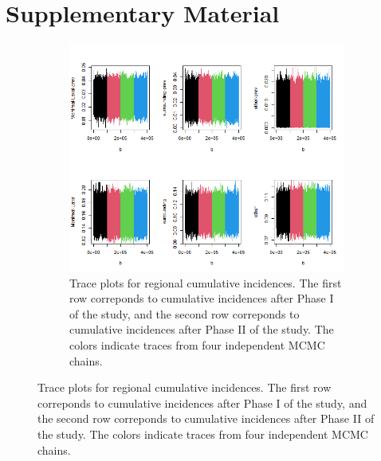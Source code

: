 \section{Supplementary Material}
\captionsetup[subfigure]{labelformat=empty}
\begin{figure}[ht!]
\centering
\begin{subfigure}[b]{\columnwidth} 
    \includegraphics[width=\columnwidth]{../../plot/trace_regional.png}
    \caption{Trace plots for regional cumulative incidences. The first row correponds to cumulative incidences after Phase I of the study, and the second row correponds to cumulative incidences after Phase II of the study. The colors indicate traces from four independent MCMC chains.}
    \label{fig:local_trace}
\end{subfigure}
\end{figure}

